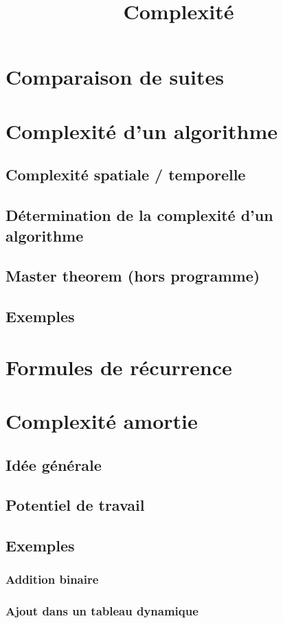 \documentclass{scrartcl}
\title{Complexité}
\author{}
\date{}
\begin{document}
	\maketitle
	\section{Comparaison de suites}
	\section{Complexité d'un algorithme}
		\subsection{Complexité spatiale / temporelle}
		\subsection{Détermination de la complexité d'un algorithme}
		\subsection{Master theorem (hors programme)}
		\subsection{Exemples}
	\section{Formules de récurrence}	
	\section{Complexité amortie}
		\subsection{Idée générale}
		\subsection{Potentiel de travail}
		\subsection{Exemples}
			\subsubsection{Addition binaire}
			\subsubsection{Ajout dans un tableau dynamique}
\end{document}
